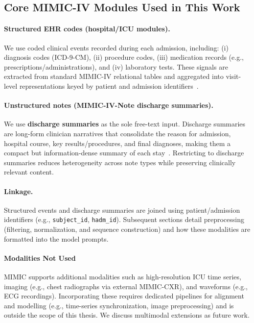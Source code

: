 \subsection{Core MIMIC-IV Modules Used in This Work}
\label{subsec:mimiciv-used}

\paragraph{Structured EHR codes (hospital/ICU modules).}
We use coded clinical events recorded during each admission, including:
(i) diagnosis codes (ICD-9-CM),
(ii) procedure codes,
(iii) medication records (e.g., prescriptions/administrations), and
(iv) laboratory tests.
These signals are extracted from standard MIMIC-IV relational tables and aggregated into visit-level representations keyed by patient and admission identifiers~\cite{johnson2023mimiciv}.

\paragraph{Unstructured notes (MIMIC-IV-Note discharge summaries).}
We use \textbf{discharge summaries} as the sole free-text input. Discharge summaries are long-form clinician narratives that consolidate the reason for admission, hospital course, key results/procedures, and final diagnoses, making them a compact but information-dense summary of each stay~\cite{vanwalraven2002dischargesummary,legault2012dischargesummaries}. Restricting to discharge summaries reduces heterogeneity across note types while preserving clinically relevant content.

\paragraph{Linkage.}
Structured events and discharge summaries are joined using patient/admission identifiers (e.g., \texttt{subject\_id}, \texttt{hadm\_id}). Subsequent sections detail preprocessing (filtering, normalization, and sequence construction) and how these modalities are formatted into the model prompts.

\paragraph{Modalities Not Used}
\label{subsec:mimiciv-not-used}

MIMIC supports additional modalities such as high-resolution ICU time series, imaging (e.g., chest radiographs via external MIMIC-CXR), and waveforms (e.g., ECG recordings). Incorporating these requires dedicated pipelines for alignment and modelling (e.g., time-series synchronization, image preprocessing) and is outside the scope of this thesis. We discuss multimodal extensions as future work.

